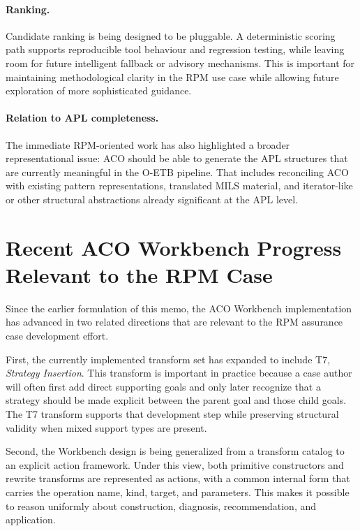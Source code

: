 \documentclass{article}
\begin{document}
\paragraph{Ranking.}
Candidate ranking is being designed to be pluggable.
A deterministic scoring path supports reproducible tool behaviour and regression testing, while leaving room for future intelligent fallback or advisory mechanisms.
This is important for maintaining methodological clarity in the RPM use case while allowing future exploration of more sophisticated guidance.

\paragraph{Relation to APL completeness.}
The immediate RPM-oriented work has also highlighted a broader representational issue: ACO should be able to generate the APL structures that are currently meaningful in the O-ETB pipeline.
That includes reconciling ACO with existing pattern representations, translated MILS material, and iterator-like or other structural abstractions already significant at the APL level.

\clearpage
\section{Recent ACO Workbench Progress Relevant to the RPM Case}\label{sec:rpm-new-progress}

Since the earlier formulation of this memo, the ACO Workbench implementation has advanced in two related directions that are relevant to the RPM assurance case development effort.

First, the currently implemented transform set has expanded to include T7, \emph{Strategy Insertion}. This transform is important in practice because a case author will often first add direct supporting goals and only later recognize that a strategy should be made explicit between the parent goal and those child goals. The T7 transform supports that development step while preserving structural validity when mixed support types are present.

Second, the Workbench design is being generalized from a transform catalog to an explicit action framework. Under this view, both primitive constructors and rewrite transforms are represented as actions, with a common internal form that carries the operation name, kind, target, and parameters. This makes it possible to reason uniformly about construction, diagnosis, recommendation, and application.
\end{document}

